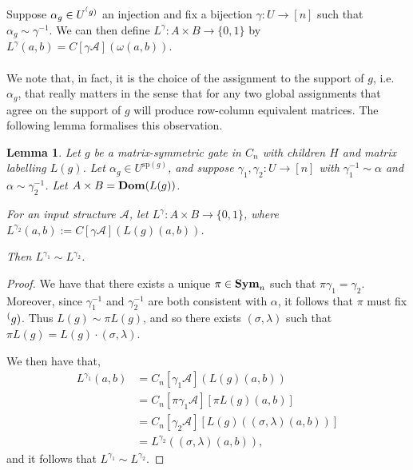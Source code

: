 \documentclass[12pt]{report}
\newtheorem{lem}[thm]{Lemma} \newtheorem{prop}[thm]{Proposition}
\newcommand{\sym}{\text{\textbf{Sym}}}
\newcommand{\dom}{\text{\textbf{Dom}}}
\newcommand{\consp}{\text{sp}}
\begin{document}
Suppose $\alpha_g \in U^{\sp(g)}$ an injection and fix a bijection $\gamma: U
\rightarrow [n]$ such that $\alpha_g \sim \gamma^{-1}$. We can then define
$L^\gamma: A \times B \rightarrow \{0,1\}$ by $L^\gamma(a,b) = C[\gamma
\mathcal{A}](\omega (a,b))$.
\\~\\
We note that, in fact, it is the choice of the assignment to the support of $g$,
i.e. $\alpha_g$, that really matters in the sense that for any two global
assignments that agree on the support of $g$ will produce row-column equivalent
matrices. The following lemma formalises this observation.

\begin{lem}
  Let $g$ be a matrix-symmetric gate in $C_n$ with children $H$ and matrix
  labelling $L(g)$. Let $\alpha_g \in U^{\consp(g)}$, and suppose $\gamma_1,
  \gamma_2: U \rightarrow [n]$ with $\gamma^{-1}_1 \sim \alpha$ and $\alpha \sim
  \gamma^{-1}_2$. Let $A \times B = \dom (L(g))$.

  For an input structure $\mathcal{A}$, let $L^\gamma: A \times B \rightarrow
  \{0,1\}$, where $L^{\gamma_2} (a,b):= C[\gamma \mathcal{A}] (L(g)(a,b))$.

  Then $L^{\gamma_1} \sim L^{\gamma_2}$.
\end{lem}
\begin{proof}
  We have that there exists a unique $\pi \in \sym_n$ such that $\pi \gamma_1 =
  \gamma_2$. Moreover, since $\gamma^{-1}_1$ and $\gamma^{-1}_2$ are both
  consistent with $\alpha$, it follows that $\pi$ must fix $\sp(g)$. Thus $L(g)
  \sim \pi L(g)$, and so there exists $(\sigma, \lambda)$ such that $\pi L(g) =
  L(g) \cdot (\sigma, \lambda)$.

  We then have that,
  \begin{align*}
    L^{\gamma_1} (a,b) &= C_n[\gamma_1 \mathcal{A}](L(g)(a,b))\\
                       & = C_n[\pi \gamma_1 \mathcal{A}][\pi L(g)(a,b)] \\
                       & = C_n[\gamma_2 \mathcal{A}][L(g)((\sigma, \lambda)(a,b))]\\
                       & = L^{\gamma_2} ((\sigma, \lambda) (a,b)),
  \end{align*}
  and it follows that $L^{\gamma_1} \sim L^{\gamma_2}$.
\end{proof}
\end{document}

